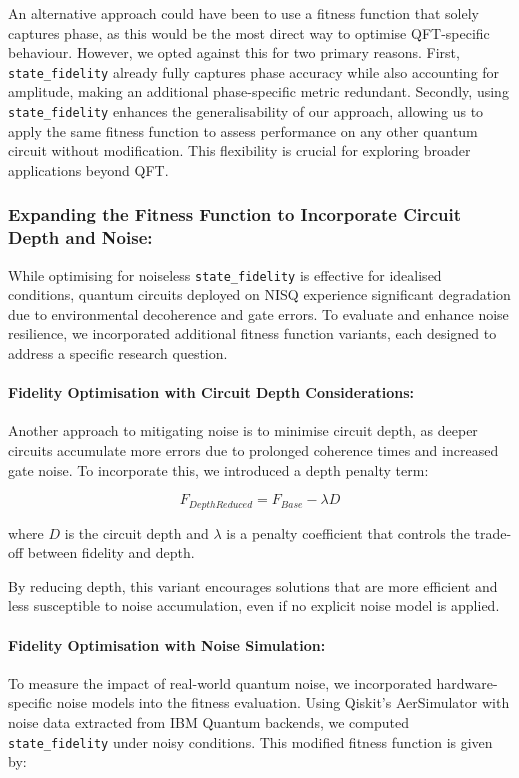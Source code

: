 \documentclass[11pt,a4paper]{article}
\begin{document}
An alternative approach could have been to use a fitness function that solely captures phase, as this would be the most direct way to optimise QFT-specific behaviour. However, we opted against this for two primary reasons. First, \texttt{state\_fidelity} already fully captures phase accuracy while also accounting for amplitude, making an additional phase-specific metric redundant. Secondly, using \texttt{state\_fidelity} enhances the generalisability of our approach, allowing us to apply the same fitness function to assess performance on any other quantum circuit without modification. This flexibility is crucial for exploring broader applications beyond QFT.

\subsubsection*{Expanding the Fitness Function to Incorporate Circuit Depth and Noise:}
While optimising for noiseless \texttt{state\_fidelity} is effective for idealised conditions, quantum circuits deployed on NISQ experience significant degradation due to environmental decoherence and gate errors. To evaluate and enhance noise resilience, we incorporated additional fitness function variants, each designed to address a specific research question.

\paragraph*{Fidelity Optimisation with Circuit Depth Considerations:\newline}
Another approach to mitigating noise is to minimise circuit depth, as deeper circuits accumulate more errors due to prolonged coherence times and increased gate noise. To incorporate this, we introduced a depth penalty term:

\begin{equation}
    F_{DepthReduced} = F_{Base} - \lambda D
\end{equation}

where $D$ is the circuit depth and $\lambda$ is a penalty coefficient that controls the trade-off between fidelity and depth.

By reducing depth, this variant encourages solutions that are more efficient and less susceptible to noise accumulation, even if no explicit noise model is applied.

\paragraph*{Fidelity Optimisation with Noise Simulation:\newline}
To measure the impact of real-world quantum noise, we incorporated hardware-specific noise models into the fitness evaluation. Using Qiskit's AerSimulator with noise data extracted from IBM Quantum backends, we computed \texttt{state\_fidelity} under noisy conditions. This modified fitness function is given by:
\end{document}
